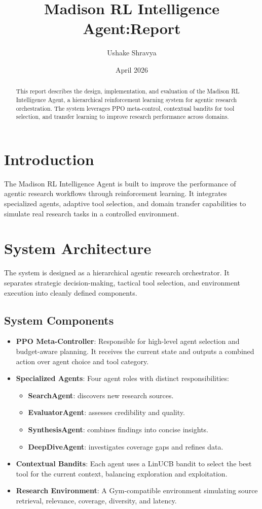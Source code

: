 \documentclass[11pt,a4paper]{article}
\title{Madison RL Intelligence Agent:\Technical Report}
\author{Ushake Shravya}
\date{April 2026}
\begin{document}
\maketitle
\begin{abstract}
This report describes the design, implementation, and evaluation of the Madison RL Intelligence Agent, a hierarchical reinforcement learning system for agentic research orchestration. The system leverages PPO meta-control, contextual bandits for tool selection, and transfer learning to improve research performance across domains.
\end{abstract}

\section{Introduction}
The Madison RL Intelligence Agent is built to improve the performance of agentic research workflows through reinforcement learning. It integrates specialized agents, adaptive tool selection, and domain transfer capabilities to simulate real research tasks in a controlled environment.

\section{System Architecture}
The system is designed as a hierarchical agentic research orchestrator. It separates strategic decision-making, tactical tool selection, and environment execution into cleanly defined components.

\subsection{System Components}
\begin{itemize}[leftmargin=*]
  \item \textbf{PPO Meta-Controller}: Responsible for high-level agent selection and budget-aware planning. It receives the current state and outputs a combined action over agent choice and tool category.
  \item \textbf{Specialized Agents}: Four agent roles with distinct responsibilities:
  \begin{itemize}[leftmargin=*]
    \item \textbf{SearchAgent}: discovers new research sources.
    \item \textbf{EvaluatorAgent}: assesses credibility and quality.
    \item \textbf{SynthesisAgent}: combines findings into concise insights.
    \item \textbf{DeepDiveAgent}: investigates coverage gaps and refines data.
  \end{itemize}
  \item \textbf{Contextual Bandits}: Each agent uses a LinUCB bandit to select the best tool for the current context, balancing exploration and exploitation.
  \item \textbf{Research Environment}: A Gym-compatible environment simulating source retrieval, relevance, coverage, diversity, and latency.
\end{itemize}
\end{document}

